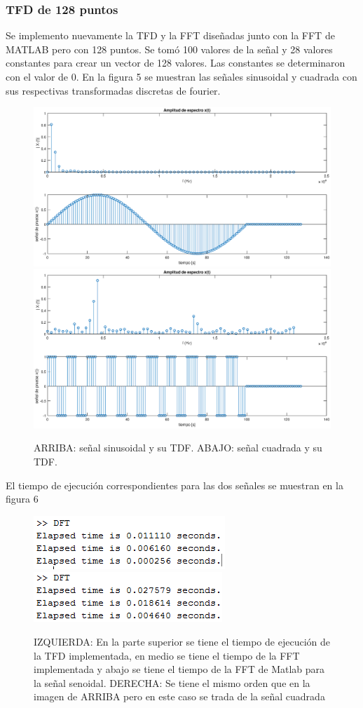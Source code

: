 \documentclass[12pt]{article}
\begin{document}
\subsubsection{TFD de 128 puntos}
Se implemento nuevamente la TFD y la FFT diseñadas junto con la FFT de MATLAB pero con 128 puntos. Se tomó 100 valores de la señal y 28 valores constantes para crear un vector de 128 valores. Las constantes se determinaron con el valor de $0$. En la figura 5 se muestran las señales sinusoidal y cuadrada con sus respectivas transformadas discretas de fourier.
\begin{figure}[h!]
 \centering
 \includegraphics[width=1\textwidth]{ima4.eps}
 \includegraphics[width=1\textwidth]{ima5.eps}
 \caption{ARRIBA: señal sinusoidal y su TDF. ABAJO: señal cuadrada y su TDF.}
 \label{fig:comparacion}
\end{figure}
\newpage
El tiempo de ejecución correspondientes para las dos señales se muestran en la figura 6
\begin{figure}[h!]
 \centering
 \includegraphics[width=.3\textwidth]{seno128.PNG}
 \includegraphics[width=.3\textwidth]{cuadrada128.PNG}
 \caption{IZQUIERDA: En la parte superior se tiene el tiempo de ejecución de la TFD  implementada, en medio se tiene el tiempo de la FFT implementada y abajo se tiene el tiempo de la FFT de Matlab para la señal senoidal. DERECHA: Se tiene el mismo orden que en la imagen de ARRIBA pero en este caso se trada de la señal cuadrada}
 \label{fig:comparacion}
\end{figure}
\newpage
\newpage
\end{document}

